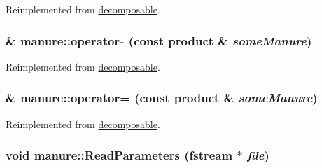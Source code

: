 Reimplemented from \hyperlink{classdecomposable_a3ce2092217848b27b52fc54327c8ad53}{decomposable}.\hypertarget{classmanure_a78dc3bbc39591aeb4ac6b3b722d66a0d}{
\subsubsection[{operator-\/}]{ \& manure::operator-\/ (const {\bf product} \& {\em someManure})}}
\label{classmanure_a78dc3bbc39591aeb4ac6b3b722d66a0d}


Reimplemented from \hyperlink{classdecomposable_a2af3d9d773f8cdf8d84ce51ed5c470ff}{decomposable}.\hypertarget{classmanure_aefa4f7856537616586ae73e8a34cdf97}{
\subsubsection[{operator=}]{ \& manure::operator= (const {\bf product} \& {\em someManure})}}
\label{classmanure_aefa4f7856537616586ae73e8a34cdf97}


Reimplemented from \hyperlink{classdecomposable_a296f63c98dd6712bfc375287c6123ea7}{decomposable}.\hypertarget{classmanure_a0bf5e3b02282ec2a7d265e04e2c3f561}{
\subsubsection[{ReadParameters}]{\setlength{\rightskip}{0pt plus 5cm}void manure::ReadParameters (fstream $\ast$ {\em file})}}
\label{classmanure_a0bf5e3b02282ec2a7d265e04e2c3f561}


